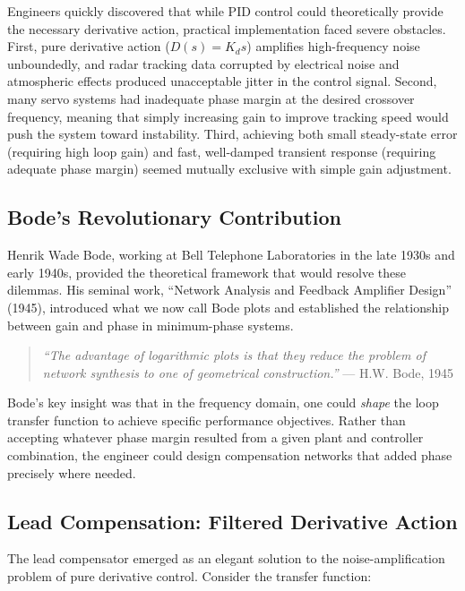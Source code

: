 Engineers quickly discovered that while PID control could theoretically provide the necessary derivative action, practical implementation faced severe obstacles. First, pure derivative action ($D(s) = K_d s$) amplifies high-frequency noise unboundedly, and radar tracking data corrupted by electrical noise and atmospheric effects produced unacceptable jitter in the control signal. Second, many servo systems had inadequate phase margin at the desired crossover frequency, meaning that simply increasing gain to improve tracking speed would push the system toward instability. Third, achieving both small steady-state error (requiring high loop gain) and fast, well-damped transient response (requiring adequate phase margin) seemed mutually exclusive with simple gain adjustment.

\subsection{Bode's Revolutionary Contribution}

Henrik Wade Bode, working at Bell Telephone Laboratories in the late 1930s and early 1940s, provided the theoretical framework that would resolve these dilemmas. His seminal work, ``Network Analysis and Feedback Amplifier Design'' (1945), introduced what we now call Bode plots and established the relationship between gain and phase in minimum-phase systems.

\begin{quotation}
\textit{``The advantage of logarithmic plots is that they reduce the problem of network synthesis to one of geometrical construction.''} --- H.W. Bode, 1945
\end{quotation}

Bode's key insight was that in the frequency domain, one could \textit{shape} the loop transfer function to achieve specific performance objectives. Rather than accepting whatever phase margin resulted from a given plant and controller combination, the engineer could design compensation networks that added phase precisely where needed.

\subsection{Lead Compensation: Filtered Derivative Action}

The lead compensator emerged as an elegant solution to the noise-amplification problem of pure derivative control. Consider the transfer function:

